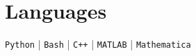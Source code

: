 \section*{Languages}

    \texttt{Python} | \texttt{Bash} | \texttt{C++} | \texttt{MATLAB} | \texttt{Mathematica}

